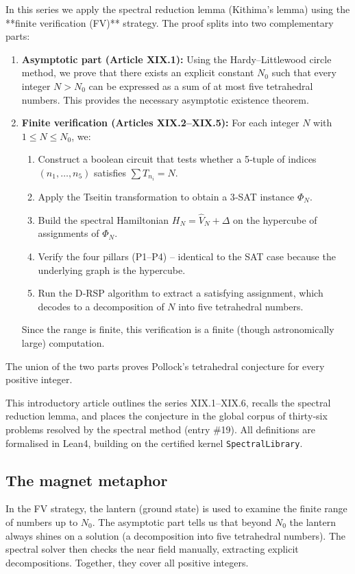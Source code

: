 \documentclass[11pt,a4paper]{article}
\begin{document}
In this series we apply the spectral reduction lemma (Kithima's lemma) using the **finite verification (FV)** strategy. The proof splits into two complementary parts:

\begin{enumerate}
\item \textbf{Asymptotic part (Article XIX.1):} Using the Hardy–Littlewood circle method, we prove that there exists an explicit constant \(N_0\) such that every integer \(N > N_0\) can be expressed as a sum of at most five tetrahedral numbers. This provides the necessary asymptotic existence theorem.
\item \textbf{Finite verification (Articles XIX.2–XIX.5):} For each integer \(N\) with \(1 \le N \le N_0\), we:
   \begin{enumerate}
   \item Construct a boolean circuit that tests whether a 5‑tuple of indices \((n_1,\dots,n_5)\) satisfies \(\sum T_{n_i} = N\).
   \item Apply the Tseitin transformation to obtain a 3‑SAT instance \(\Phi_N\).
   \item Build the spectral Hamiltonian \(H_N = \hat{V}_N + \Delta\) on the hypercube of assignments of \(\Phi_N\).
   \item Verify the four pillars (P1–P4) – identical to the SAT case because the underlying graph is the hypercube.
   \item Run the D‑RSP algorithm to extract a satisfying assignment, which decodes to a decomposition of \(N\) into five tetrahedral numbers.
   \end{enumerate}
   Since the range is finite, this verification is a finite (though astronomically large) computation.
\end{enumerate}
The union of the two parts proves Pollock's tetrahedral conjecture for every positive integer.

This introductory article outlines the series XIX.1–XIX.6, recalls the spectral reduction lemma, and places the conjecture in the global corpus of thirty‑six problems resolved by the spectral method (entry \#19). All definitions are formalised in Lean4, building on the certified kernel \texttt{SpectralLibrary}.

\subsection{The magnet metaphor}

In the FV strategy, the lantern (ground state) is used to examine the finite range of numbers up to \(N_0\). The asymptotic part tells us that beyond \(N_0\) the lantern always shines on a solution (a decomposition into five tetrahedral numbers). The spectral solver then checks the near field manually, extracting explicit decompositions. Together, they cover all positive integers.
\end{document}
